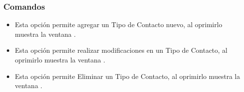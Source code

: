 \subsubsection{Comandos}
\begin{itemize}
 \item {} Esta opción permite agregar un Tipo de Contacto  nuevo, al oprimirlo muestra la ventana .
 \item {} Esta opción permite realizar modificaciones en un Tipo de Contacto, al oprimirlo muestra la ventana .
 \item {} Esta opción permite Eliminar un Tipo de Contacto, al oprimirlo muestra la ventana .

\end{itemize}


